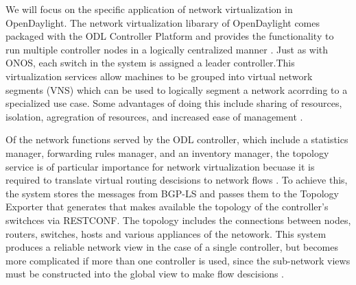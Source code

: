 \documentclass[letterpaper,twocolumn,10pt]{article}
\begin{document}
We will focus on the specific application of network virtualization in OpenDaylight. The network virtualization libarary of OpenDaylight comes packaged with the ODL Controller Platform and provides the functionality to run multiple controller nodes in a logically centralized manner \cite{ONV:wiki}. Just as with ONOS, each switch in the system is assigned a leader controller.This virtualization services allow machines to be grouped into virtual network segments (VNS) which can be used to logically segment a network acorrding to a specialized use case. Some advantages of doing this include sharing of resources, isolation, agregration of resources, and increased ease of management \cite{jain2013network}.

Of the network functions served by the ODL controller, which include a statistics manager, forwarding rules manager, and an inventory manager, the topology service is of particular importance for network virtualization becuase it is required to translate virtual routing descisions to network flows \cite{jain2013network}. To achieve this, the system stores the messages from BGP-LS and passes them to the Topology Exporter that generates that makes available the topology of the controller's switchces via RESTCONF. The topology includes the connections between nodes, routers, switches, hosts and various appliances of the netowork. This system produces a reliable network view in the case of a single controller, but becomes more complicated if more than one controller is used, since the sub-network views must be constructed into the global view to make flow descisions \cite{bgp:rfc}.


% 
% 
% 
% 



\end{document}
